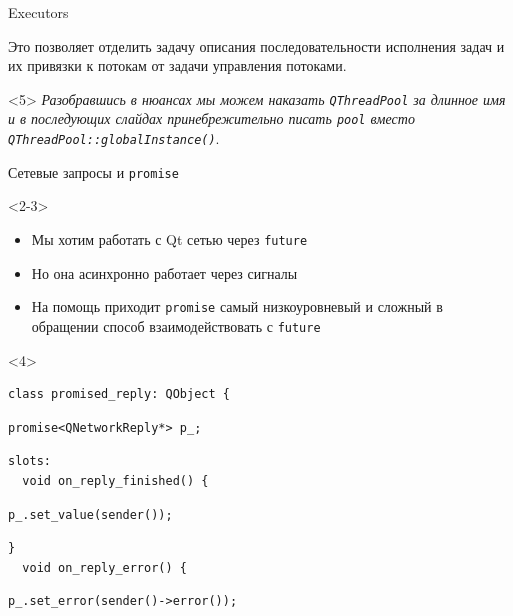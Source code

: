 \documentclass[aspectratio=169,pdf,hyperref={unicode},17pt]{beamer}
\begin{document}
\begin{frame}[fragile,t]{Executors}
\begin{onlyenv}
Это позволяет отделить задачу описания последовательности исполнения задач и их привязки к потокам от задачи управления
потоками.
\end{onlyenv}
\begin{onlyenv}<5>
\textit{\footnotesize{Разобравшись в нюансах мы можем наказать \texttt{QThreadPool} за длинное имя и в последующих слайдах принебрежительно писать \texttt{pool} вместо \texttt{QThreadPool::globalInstance()}}}.
\end{onlyenv}
\end{frame}

\begin{frame}[fragile,t]{Сетевые запросы и \texttt{promise}}
\begin{onlyenv}<2-3>
\begin{itemize}
 \item<2-> Мы хотим работать с Qt сетью через \texttt{future}
 \item<2-> Но она асинхронно работает через сигналы
 \item<3> На помощь приходит \texttt{promise} самый низкоуровневый и сложный в обращении способ взаимодействовать с \texttt{future}
\end{itemize}
\end{onlyenv}
\begin{onlyenv}<4>
\begin{lstlisting}[style=cppcode,aboveskip=0pt,belowskip=0pt]
class promised_reply: QObject {
\end{lstlisting}
\begin{lstlisting}[style=cppcode,backgroundcolor=\color{gray!30},aboveskip=0pt,belowskip=0pt]
  promise<QNetworkReply*> p_;
\end{lstlisting}
\begin{lstlisting}[style=cppcode,aboveskip=0pt,belowskip=0pt]
slots:
  void on_reply_finished() {
\end{lstlisting}
\begin{lstlisting}[style=cppcode,backgroundcolor=\color{gray!30},aboveskip=0pt,belowskip=0pt]
    p_.set_value(sender());
\end{lstlisting}
\begin{lstlisting}[style=cppcode,aboveskip=0pt,belowskip=0pt]
  }
  void on_reply_error() {
\end{lstlisting}
\begin{lstlisting}[style=cppcode,backgroundcolor=\color{gray!30},aboveskip=0pt,belowskip=0pt]
    p_.set_error(sender()->error());
\end{lstlisting}
\begin{lstlisting}[style=cppcode,aboveskip=0pt,belowskip=0pt]

\end{lstlisting}
\end{onlyenv}
\end{frame}
\end{document}
